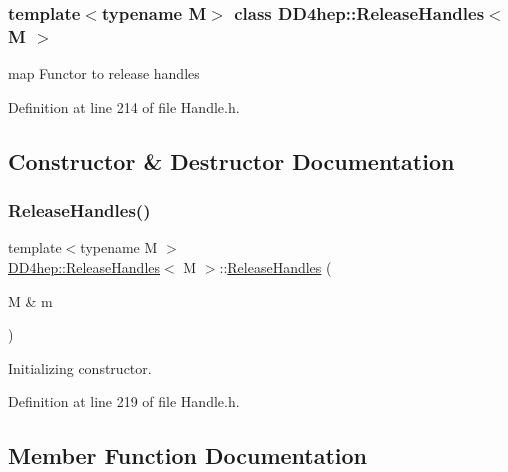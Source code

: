\subsubsection*{template$<$typename M$>$\newline
class D\+D4hep\+::\+Release\+Handles$<$ M $>$}

map Functor to release handles 

Definition at line 214 of file Handle.\+h.



\subsection{Constructor \& Destructor Documentation}
\hypertarget{class_d_d4hep_1_1_release_handles_ab9f432d35b2e93e934d5346e9d7a3608}{}\label{class_d_d4hep_1_1_release_handles_ab9f432d35b2e93e934d5346e9d7a3608} 
\subsubsection{\texorpdfstring{Release\+Handles()}{ReleaseHandles()}}
{\footnotesize\ttfamily template$<$typename M $>$ \\
\hyperlink{class_d_d4hep_1_1_release_handles}{D\+D4hep\+::\+Release\+Handles}$<$ M $>$\+::\hyperlink{class_d_d4hep_1_1_release_handles}{Release\+Handles} (\begin{DoxyParamCaption}\item[{M \&}]{m }\end{DoxyParamCaption})\hspace{0.3cm}{\ttfamily [inline]}}



Initializing constructor. 



Definition at line 219 of file Handle.\+h.



\subsection{Member Function Documentation}
\hypertarget{class_d_d4hep_1_1_release_handles_acae11ef8267e0a463b041c9134f1cef3}{}\label{class_d_d4hep_1_1_release_handles_acae11ef8267e0a463b041c9134f1cef3} 
